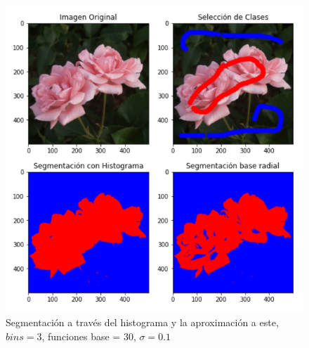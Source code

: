 \documentclass[conference]{IEEEtran}
\begin{document}
\begin{figure}[htbp]
    \centerline{\includegraphics[scale=0.4]{3.png}}
    \caption{Segmentación a través del histograma y la aproximación a este, $bins=3$, funciones base = 30, $\sigma=0.1$}
    \label{img-e3-3}
\end{figure}
\end{document}
